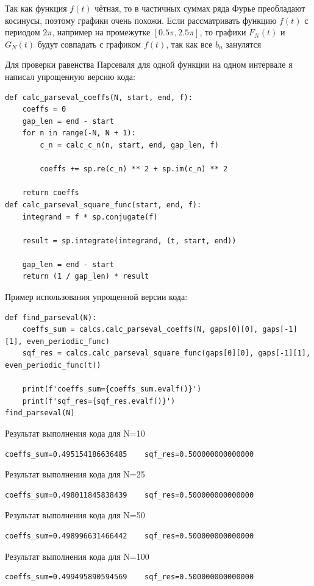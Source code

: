 \documentclass[a4paper, 16pt]{article}
\begin{document}
\noindent Так как функция $f(t)$ чётная, то в частичных суммах ряда
Фурье преобладают косинусы, поэтому графики очень похожи. Если рассматривать функцию $f(t)$
с периодом $2\pi$, например на промежутке $[0.5\pi, 2.5\pi]$, то графики $F_N(t)$ и $G_N(t)$ будут
совпадать с графиком $f(t)$, так как все $b_n$ занулятся


\newpage
\noindent Для проверки равенства Парсеваля для одной функции на одном интервале я написал упрощенную версию кода:
\begin{lstlisting}
def calc_parseval_coeffs(N, start, end, f):
    coeffs = 0
    gap_len = end - start
    for n in range(-N, N + 1):
        c_n = calc_c_n(n, start, end, gap_len, f)

        coeffs += sp.re(c_n) ** 2 + sp.im(c_n) ** 2

    return coeffs
def calc_parseval_square_func(start, end, f):
    integrand = f * sp.conjugate(f)

    result = sp.integrate(integrand, (t, start, end))

    gap_len = end - start
    return (1 / gap_len) * result
\end{lstlisting}


\noindent Пример использования упрощенной версии кода:
\begin{lstlisting}
def find_parseval(N):
    coeffs_sum = calcs.calc_parseval_coeffs(N, gaps[0][0], gaps[-1][1], even_periodic_func)
    sqf_res = calcs.calc_parseval_square_func(gaps[0][0], gaps[-1][1], even_periodic_func(t))

    print(f'coeffs_sum={coeffs_sum.evalf()}')
    print(f'sqf_res={sqf_res.evalf()}')
find_parseval(N)
\end{lstlisting}


\noindent Результат выполнения кода для N=10
\begin{lstlisting}
coeffs_sum=0.495154186636485    sqf_res=0.500000000000000
\end{lstlisting}


\noindent Результат выполнения кода для N=25
\begin{lstlisting}
coeffs_sum=0.498011845838439    sqf_res=0.500000000000000
\end{lstlisting}


\noindent Результат выполнения кода для N=50
\begin{lstlisting}
coeffs_sum=0.498996631466442    sqf_res=0.500000000000000
\end{lstlisting}


\noindent Результат выполнения кода для N=100
\begin{lstlisting}
coeffs_sum=0.499495890594569    sqf_res=0.500000000000000
\end{lstlisting}
\end{document}
